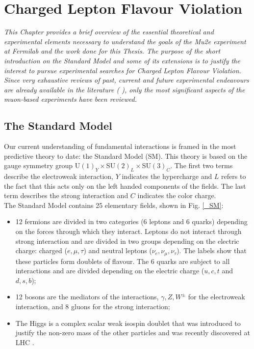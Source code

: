 \documentclass[12pt,a4paper,openright, oneside, titlepage]{book} %
\begin{document}
\tableofcontents
\listoffigures
\listoftables

\mainmatter
\chapter{Charged Lepton Flavour Violation}

{\itshape 
This Chapter provides a brief overview of the essential theoretical and experimental elements
necessary to understand the goals of the Mu2e experiment at Fermilab and the work done
for this Thesis. 
The purpose of the short introduction on the Standard Model and some of its extensions 
is to justify the interest to pursue experimental searches for Charged Lepton Flavour Violation. 
Since very exhaustive reviews of past, current and future experimental endeavours 
are already available in the literature (\cite{signorelli} \cite{bob_cflv}), 
only the most significant aspects of the muon-based experiments have been reviewed.} 

\section{The Standard Model}
Our current understanding of fundamental interactions is framed 
in the most predictive theory to date: the Standard Model (SM). 
This theory is based on the gauge symmetry group U$(1)_Y \times $SU$(2)_L\times $SU$(3)_C$.
The first two terms describe the electroweak interaction, 
$Y$ indicates the hypercharge and  
$L$ refers to the fact that this acts only on the left handed components of the fields. 
The last term describes the strong interaction and $C$ indicates the color charge.\\
The Standard Model contains 25 elementary fields, shown in Fig. \ref{_SM}: 
\begin{itemize}
\item 12 fermions are divided in two categories (6 leptons and 6 quarks)
depending on the forces through which they interact.
Leptons do not interact through strong interaction 
and are divided in two groups depending on the electric charge: 
charged ($e,\mu,\tau$) and neutral leptons ($\nu_e,\nu_\mu,\nu_\tau$). 
The labels show that these particles form doublets of flavour.
The 6 quarks are subject to all interactions 
and are divided depending on the electric charge ($u,c,t$ and $d,s,b$);
\item 12 bosons are the mediators of the interactions, 
$\gamma,Z,W^\pm$ for the electroweak interaction, 
and 8 gluons for the strong interaction;
\item The Higgs is a complex scalar weak isospin doublet that was introduced 
to justify the non-zero mass of the other particles and was recently discovered at LHC \cite{H:CMS}\cite{H:ATLAS}.
\end{itemize}
\end{document}
